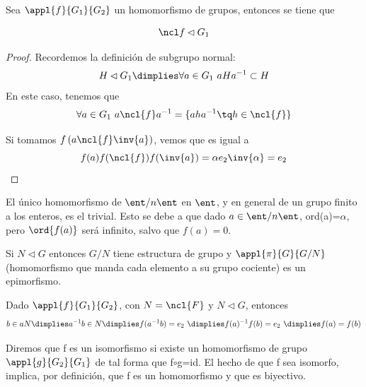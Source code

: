 \documentclass{apuntes}
\begin{document}
\begin{lemma} Sea $\appl{f}{G_1}{G_2}$ un homomorfismo de grupos, entonces se tiene que

\[ \ncl f \lhd G_1 \]
\end{lemma}

\begin{proof} Recordemos la definición de subgrupo normal:
\[ H \lhd G_1 \dimplies \forall a\in G_1\ aHa^{-1}\subset H \]
En este caso, tenemos que
\[ \forall a\in G_1\ a\ncl{f}a^{-1} = \{aha^{-1} \tq h\in \ncl{f} \} \]

Si tomamos $f\left(a\ncl{f}\inv{a}\right)$, vemos que es igual a \[ f(a) f(\ncl{f}) f(\inv{a}) = \alpha e_2 \inv{\alpha} = e_2 \]
\end{proof}

\begin{remark}El único homomorfismo de $\ent/n\ent$  en $\ent$, y en general de un grupo finito a los enteros, es el trivial. Esto se debe
a que dado $a\in\ent/n\ent$, ord(a)=$\alpha$, pero $\ord{f(a)}$ será infinito, salvo que $f(a)=0$.\end{remark}
  
\begin{lemma} Si $N\lhd G$ entonces $G/N$ tiene estructura de grupo y $\appl{\pi}{G}{G/N}$  (homomorfismo que manda cada
elemento a su grupo cociente)  es un epimorfismo.
\end{lemma}

\begin{lemma} Dado $\appl{f}{G_1}{G_2}$, con $N=\ncl{F}$ y $N \lhd G$, entonces
\[ b\in aN \dimplies  a^{-1}b\in N \dimplies f(a^{-1}b)=e_2 \ \dimplies f(a)^{-1}f(b)=e_2 \ \dimplies f(a)=f(b) \]
\end{lemma}

\begin{defn}[Isomorfismo]
Diremos que f es un isomorfismo si existe un homomorfismo de grupo $\appl{g}{G_2}{G_1}$  de tal forma que f$\circ$g=id. El hecho de
que f sea isomorfo, implica, por definición, que f es un homomorfismo y que es biyectivo.
\end{defn}
\end{document}
